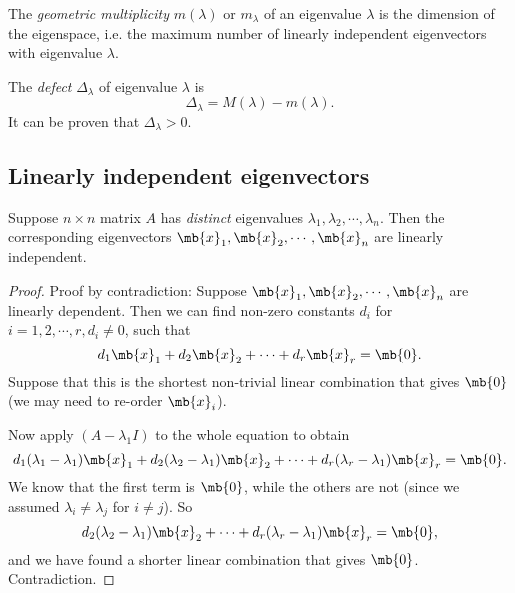 \documentclass[a4paper]{article}
\begin{document}
\begin{defi}
  The \emph{geometric multiplicity} $m(\lambda)$ or $m_\lambda$ of an eigenvalue $\lambda$ is the dimension of the eigenspace, i.e. the maximum number of linearly independent eigenvectors with eigenvalue $\lambda$.
\end{defi}

\begin{defi}
  The \emph{defect} $\Delta_\lambda$ of eigenvalue $\lambda$ is
  \[
  \Delta_\lambda = M(\lambda) - m(\lambda).
  \]
  It can be proven that $\Delta_\lambda > 0$.
\end{defi}

\subsection{Linearly independent eigenvectors}
\begin{thm}
  Suppose $n\times n$ matrix $A$ has \emph{distinct} eigenvalues $\lambda_1, \lambda_2, \cdots, \lambda_n$. Then the corresponding eigenvectors $\mb{x}_1, \mb{x}_2, \cdots, \mb{x}_n$ are linearly independent.
\end{thm}

\begin{proof}
  Proof by contradiction: Suppose $\mb{x}_1, \mb{x}_2, \cdots, \mb{x}_n$ are linearly dependent. Then we can find non-zero constants $d_i$ for $i = 1, 2, \cdots, r, d_i\not= 0$, such that
  \[
  d_1\mb{x}_1 + d_2\mb{x}_2 + \cdots + d_r\mb{x}_r = \mb{0}.
  \]
  Suppose that this is the shortest non-trivial linear combination that gives $\mb{0}$ (we may need to re-order $\mb{x}_i$).

  Now apply $(A - \lambda_1 I)$ to the whole equation to obtain
  \[
  d_1(\lambda_1 - \lambda_1)\mb{x}_1 + d_2(\lambda_2 - \lambda_1)\mb{x}_2 + \cdots + d_r(\lambda_r - \lambda_1)\mb{x}_r = \mb{0}.
  \]
  We know that the first term is $\mb{0}$, while the others are not (since we assumed $\lambda_i \not= \lambda_j$ for $i\not= j$). So
  \[
  d_2(\lambda_2 - \lambda_1)\mb{x}_2 + \cdots + d_r(\lambda_r - \lambda_1)\mb{x}_r = \mb{0},
  \]
  and we have found a shorter linear combination that gives $\mb{0}$. Contradiction.
\end{proof}
\end{document}
